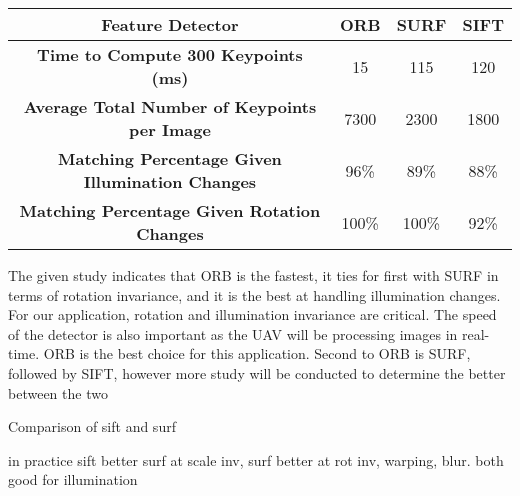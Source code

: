 \begin{table}[H]
\centering
\begin{tabular}{|c|c|c|c|}
\hline
\textbf{Feature Detector} & \textbf{ORB} & \textbf{SURF} & \textbf{SIFT} \\ \hline
\textbf{Time to Compute 300 Keypoints (ms)} & 15 & 115 & 120 \\ \hline
\textbf{Average Total Number of Keypoints per Image} & 7300 & 2300 & 1800 \\ \hline
\textbf{Matching Percentage Given Illumination Changes} & 96\% & 89\% & 88\% \\ \hline
\textbf{Matching Percentage Given Rotation Changes} & 100\% & 100\% & 92\% \\ \hline
\end{tabular}
\end{table}

The given study indicates that ORB is the fastest, it ties for first with SURF in terms of rotation invariance, and it is the best at handling illumination changes. For our application, rotation and illumination invariance are critical. The speed of the detector is also important as the UAV will be processing images in real-time. ORB is the best choice for this application. Second to ORB is SURF, followed by SIFT, however more study will be conducted to determine the better between the two



Comparison of sift and surf







in practice sift better surf at scale inv, surf better at rot inv, warping, blur. both good for illumination


